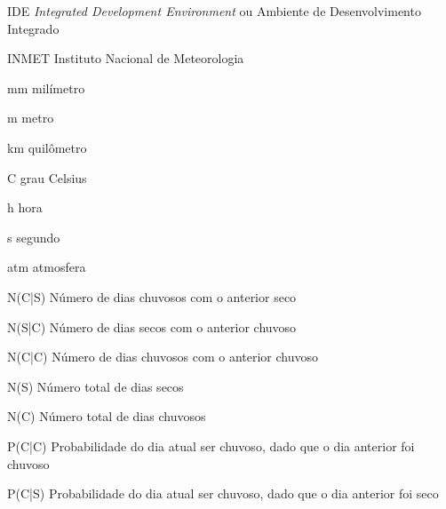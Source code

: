 \documentclass[
	12pt,				%
	openright,			%
	oneside,			%
	a4paper,			%
	english,			%
	french,				%
	spanish,			%
	brazil,				%
	]{lib/abntex2}
\newcommand{\listofquadrosname}{Lista de quadros}
\begin{document}
\listoffigures*
\cleardoublepage



\listoftables*
\cleardoublepage

\begin{siglas}
    \item[IDE] \emph{Integrated Development Environment} ou Ambiente de Desenvolvimento Integrado
    \item[INMET] Instituto Nacional de Meteorologia
	\item[mm] milímetro
	\item[m] metro
	\item[km] quilômetro
	\item[\degree C] grau Celsius
	\item[h] hora
	\item[s] segundo
	\item[atm] atmosfera
	\item[N(C|S)] Número de dias chuvosos com o anterior seco
	\item[N(S|C)] Número de dias secos com o anterior chuvoso
	\item[N(C|C)] Número de dias chuvosos com o anterior chuvoso
	\item[N(S)] Número total de dias secos
	\item[N(C)] Número total de dias chuvosos
	\item[P(C|C)] Probabilidade do dia atual ser chuvoso, dado que o dia anterior foi chuvoso
	\item[P(C|S)] Probabilidade do dia atual ser chuvoso, dado que o dia anterior foi seco
\end{siglas}


\tableofcontents*
\cleardoublepage
\end{document}
